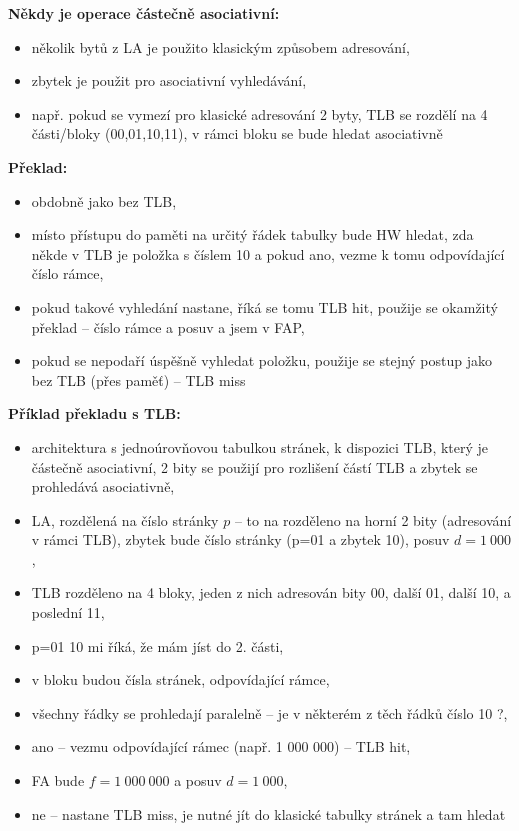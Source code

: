 \documentclass[a4paper, 11pt]{article}
\begin{document}
\textbf{Někdy je operace částečně asociativní:}
\begin{itemize}
    \item několik bytů z LA je použito klasickým způsobem adresování,
    \item zbytek je použit pro asociativní vyhledávání,
    \item např. pokud se vymezí pro klasické adresování 2 byty, TLB se rozdělí na 4 části/bloky (00,01,10,11), v rámci bloku se bude hledat asociativně
\end{itemize}

\textbf{Překlad:}
\begin{itemize}
    \item obdobně jako bez TLB,
    \item místo přístupu do paměti na určitý řádek tabulky bude HW hledat, zda někde v TLB je položka s číslem 10 a pokud ano, vezme k tomu odpovídající číslo rámce,
    \item pokud takové vyhledání nastane, říká se tomu TLB hit, použije se okamžitý překlad -- číslo rámce a posuv a jsem v FAP,
    \item pokud se nepodaří úspěšně vyhledat položku, použije se stejný postup jako bez TLB (přes paměť) -- TLB miss
\end{itemize}
 
\textbf{Příklad překladu s TLB:}
\begin{itemize}
    \item architektura s jednoúrovňovou tabulkou stránek, k dispozici TLB, který je částečně asociativní, 2 bity se použijí pro rozlišení částí TLB a zbytek se prohledává asociativně,
    \item LA, rozdělená na číslo stránky $p$ -- to na rozděleno na horní 2 bity (adresování v rámci TLB), zbytek bude číslo stránky (p=01 a zbytek 10), posuv $d=1\ 000$,
    \item TLB rozděleno na 4 bloky, jeden z nich adresován bity 00, další 01, další 10, a poslední 11,
    \item p=01 10 mi říká, že mám jíst do 2. části,
    \item v bloku budou čísla stránek, odpovídající rámce,
    \item všechny řádky se prohledají paralelně -- je v některém z těch řádků číslo 10 ?,
    \item ano -- vezmu odpovídající rámec (např. 1 000 000) -- TLB hit,
    \item FA bude $f=1\ 000\ 000$ a posuv $d=1\ 000$,
    \item ne -- nastane TLB miss, je nutné jít do klasické tabulky stránek a tam hledat
\end{itemize}
\end{document}
